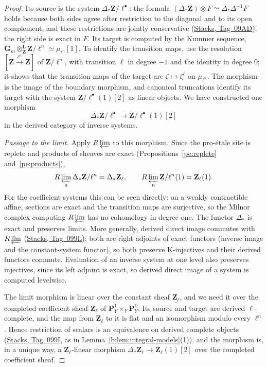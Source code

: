 \documentclass[11pt,a4paper]{article}
\numberwithin{equation}{section}
\theoremstyle{definition}
\theoremstyle{remark}
\newcommand{\Zl}{\mathbf Z_\ell}
\newcommand{\stacks}[1]{\href{https://stacks.math.columbia.edu/tag/#1}{\textnormal{Stacks, Tag~#1}}}
\begin{document}
\begin{proof}
Its source is the system $\Delta_*\mathbf Z/\ell^\bullet$: the formula
$(\Delta_*\mathbf Z)\otimes F\simeq\Delta_*\Delta^{-1}F$ holds because
both sides agree after restriction to the diagonal and to its open
complement, and these restrictions are jointly conservative
(\stacks{09AD}); the right side is exact in $F$. Its target is
computed by the Kummer sequence,
$\mathbf G_m\otimes^{\mathbf L}_{\mathbf Z}\mathbf Z/\ell^n\simeq\mu_{\ell^n}[1]$.
To identify the transition maps, use the resolution
$[\mathbf Z\xrightarrow{\ell^n}\mathbf Z]$ of $\mathbf Z/\ell^n$, with
transition $\ell$ in degree $-1$ and the identity in degree $0$; it
shows that the transition maps of the target are
$\zeta\mapsto\zeta^\ell$ on $\mu_{\ell^n}$. The morphism is
the image of the boundary morphism, and canonical truncations
identify its target with the system $\mathbf Z/\ell^\bullet(1)[2]$ as
linear objects. We have constructed one morphism
\[
 \Delta_*\mathbf Z/\ell^\bullet\longrightarrow \mathbf Z/\ell^\bullet(1)[2]
\]
in the derived category of inverse systems.

\emph{Passage to the limit.} Apply $R\varprojlim$ to this morphism.
Since the pro-\'etale site is replete and products of sheaves are exact
(Propositions~\ref{pe:replete} and~\ref{pe:products}),
\[
 R\varprojlim_n\Delta_*\mathbf Z/\ell^n=\Delta_*\Zl,\qquad
 R\varprojlim_n \mathbf Z/\ell^n(1)=\Zl(1).
\]
For the coefficient systems this can be seen directly: on a weakly
contractible affine, sections are exact and the transition maps are
surjective, so the Milnor complex computing $R\varprojlim$ has no
cohomology in degree one. The functor $\Delta_*$ is exact and preserves
limits. More generally, derived direct image commutes with
$R\varprojlim$ (\stacks{099L}): both are right adjoints of exact functors
(inverse image and the constant-system functor), so both preserve
K-injectives and their derived functors commute. Evaluation of an
inverse system at one level also preserves injectives, since its left
adjoint is exact, so derived direct image of a system is computed
levelwise.

The limit morphism is linear over the constant sheaf
$\underline{\mathbf Z_\ell}$, and we need it over the completed
coefficient sheaf $\mathbf Z_{\ell}$ of $\mathbf P^1_Y\times_Y\mathbf P^1_Y$.
Its source and target are derived $\ell$-complete, and
the map from $\underline{\mathbf Z_\ell}$ to it is flat and an
isomorphism modulo every $\ell^n$. Hence restriction of scalars is an
equivalence on derived complete objects (\stacks{099I}, as in
Lemma~\ref{b:lem:integral-models}(1)), and the morphism is, in a unique
way, a $\Zl$-linear morphism $\Delta_*\Zl\to\Zl(1)[2]$ over the
completed coefficient sheaf.


\end{proof}
\end{document}
